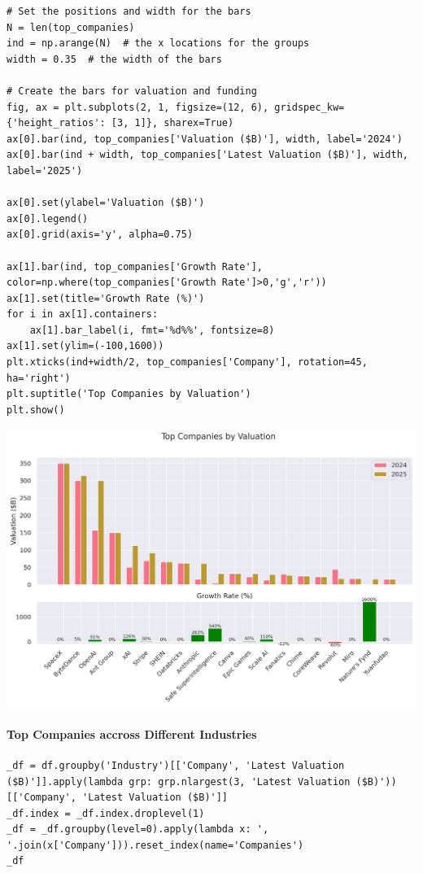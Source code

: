 \documentclass[a4paper,12pt]{article}
\begin{document}
\begin{verbatim}
# Set the positions and width for the bars
N = len(top_companies)
ind = np.arange(N)  # the x locations for the groups
width = 0.35  # the width of the bars

# Create the bars for valuation and funding
fig, ax = plt.subplots(2, 1, figsize=(12, 6), gridspec_kw={'height_ratios': [3, 1]}, sharex=True)
ax[0].bar(ind, top_companies['Valuation ($B)'], width, label='2024')
ax[0].bar(ind + width, top_companies['Latest Valuation ($B)'], width, label='2025')

ax[0].set(ylabel='Valuation ($B)')
ax[0].legend()
ax[0].grid(axis='y', alpha=0.75)

ax[1].bar(ind, top_companies['Growth Rate'], color=np.where(top_companies['Growth Rate']>0,'g','r'))
ax[1].set(title='Growth Rate (%)')
for i in ax[1].containers:
    ax[1].bar_label(i, fmt='%d%%', fontsize=8)
ax[1].set(ylim=(-100,1600))
plt.xticks(ind+width/2, top_companies['Company'], rotation=45, ha='right')
plt.suptitle('Top Companies by Valuation')
plt.show()
\end{verbatim}

\begin{center}
\includegraphics[width=.9\linewidth]{./.ob-jupyter/e5280d601c8b3020651869b90202313e8f489129.png}
\label{}
\end{center}
\paragraph{Top Companies accross Different Industries}
\label{sec:orga3c56be}
\begin{verbatim}
_df = df.groupby('Industry')[['Company', 'Latest Valuation ($B)']].apply(lambda grp: grp.nlargest(3, 'Latest Valuation ($B)'))[['Company', 'Latest Valuation ($B)']]
_df.index = _df.index.droplevel(1)
_df = _df.groupby(level=0).apply(lambda x: ', '.join(x['Company'])).reset_index(name='Companies')
_df
\end{verbatim}
\end{document}
